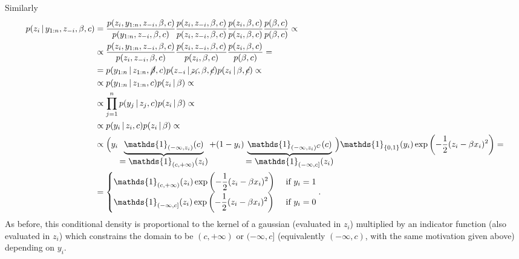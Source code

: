 \documentclass[
  11pt,
]{article}
\begin{document}
Similarly \begin{align*}
        p(z_i \,|\,y_{1:n}, z_{-i}, \beta, c) & = \frac{p(z_i, y_{1:n}, z_{-i}, \beta, c)}{p(y_{1:n}, z_{-i}, \beta, c)} \frac{p(z_i, z_{-i}, \beta, c)}{p(z_i, z_{-i}, \beta, c)} \frac{p(z_i, \beta, c)}{p(z_i, \beta, c)} \frac{p(\beta, c)}{p(\beta, c)} \propto \\
        & \propto \frac{p(z_i, y_{1:n}, z_{-i}, \beta, c)}{p(z_i, z_{-i}, \beta, c)} \frac{p(z_i, z_{-i}, \beta, c)}{p(z_i, \beta, c)} \frac{p(z_i, \beta, c)}{p(\beta, c)} = \\
        & = p(y_{1:n} \,|\,z_{1:n}, \cancel{\beta}, c) p(z_{-i} \,|\,\cancel{z_i}, \beta, \cancel{c}) p(z_i \,|\,\beta, \cancel{c}) \propto \\
        & \propto p(y_{1:n} \,|\,z_{1:n}, c) p(z_i \,|\,\beta) \propto \\
        & \propto \prod_{j = 1}^n p(y_j \,|\,z_j, c) p(z_i \,|\,\beta) \propto \\
        & \propto p(y_i \,|\,z_i, c) p(z_i \,|\,\beta) \propto \\
        & \propto \Big(y_i \underbrace{\mathds{1}_{(-\infty, z_i)}(c)}_{\displaystyle = \mathds{1}_{(c, +\infty)}(z_i)} + (1 - y_i) \underbrace{\mathds{1}_{(-\infty, z_i)^C}(c)}_{\displaystyle = \mathds{1}_{(-\infty, c]}(z_i)}\Big) \mathds{1}_{\{0, 1\}}(y_i) \operatorname{exp}\left(-\frac{1}{2} (z_i - \beta x_i)^2\right) = \\
        & = 
            \begin{cases}
                \displaystyle \mathds{1}_{(c, +\infty)}(z_i) \operatorname{exp}\left(-\frac{1}{2} (z_i - \beta x_i)^2\right) & \text{ if } y_i = 1 \\
                \displaystyle \mathds{1}_{(-\infty, c]}(z_i) \operatorname{exp}\left(-\frac{1}{2} (z_i - \beta x_i)^2\right) & \text{ if } y_i = 0 \\
            \end{cases}.
    \end{align*} As before, this conditional density is proportional to
the kernel of a gaussian (evaluated in \(z_i\)) multiplied by an
indicator function (also evaluated in \(z_i\)) which constrains the
domain to be \((c, +\infty)\) or \((-\infty, c]\) (equivalently
\((-\infty, c)\), with the same motivation given above) depending on
\(y_i\).\\
\end{document}
